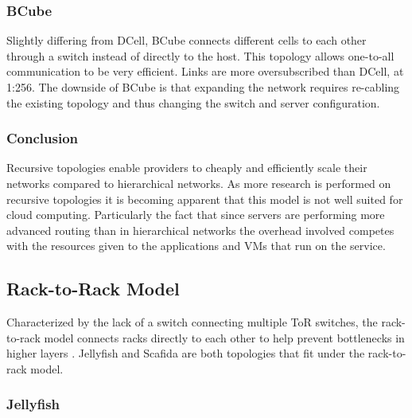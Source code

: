 \documentclass[12pt]{article}
\begin{document}


\subsubsection{BCube} \label{subp:bcube}

Slightly differing from DCell, BCube connects different cells to each other through a switch instead of directly to the host. This topology allows one-to-all communication to be very efficient. Links are more oversubscribed than DCell, at 1:256. The downside of BCube is that expanding the network requires re-cabling the existing topology and thus changing the switch and server configuration.


\subsubsection{Conclusion} \label{ssub:recursive-concl}



Recursive topologies enable providers to cheaply and efficiently scale their networks compared to hierarchical networks. As more research is performed on recursive topologies it is becoming apparent that this model is not well suited for cloud computing. Particularly the fact that since servers are performing more advanced routing than in hierarchical networks the overhead involved competes with the resources given to the applications and VMs that run on the service.


\subsection{Rack-to-Rack Model} \label{sub:net-rack}

Characterized by the lack of a switch connecting multiple ToR switches, the rack-to-rack model connects racks directly to each other to help prevent bottlenecks in higher layers \cite{wang2015survey, xia2016survey}. Jellyfish \cite{singla2012jellyfish} and Scafida \cite{gyarmati2010scafida} are both topologies that fit under the rack-to-rack model.


\subsubsection{Jellyfish} \label{subp:jellyfish}
\end{document}
